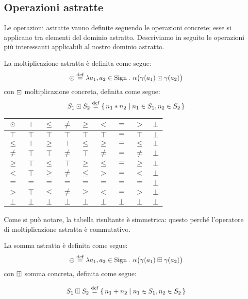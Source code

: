 \subsection{Operazioni astratte}
Le operazioni astratte vanno definite seguendo le operazioni concrete;
esse si applicano tra elementi del dominio astratto.
Descriviamo in seguito le operazioni più interessanti applicabili
al nostro dominio astratto.

\begin{definizione}
La moltiplicazione astratta è definita come segue:
\[
	\absmul \defeq \lambda a_1,a_2 \in \Sign \st \alpha\bigl(\gamma(a_1) \conmul \gamma(a_2)\bigr)
\]
con $\mathbin{\boxdot}$ moltiplicazione concreta, definita come segue:
\[
	S_1 \conmul S_2 \defeq \{\, n_1 * n_2 \mid n_1 \in S_1, n_2 \in S_2 \,\}
\]
\end{definizione}

\begin{center}
	\begin{tabular}{ c | c c c c c c c c }
		$\mathbin{\odot}$ & $\top$ & $\leq$ & $\neq$ & $\geq$ & $<$ & $=$ & $>$ & $\bot$ \\
		\hline
		$\top$ & $\top$ & $\top$ & $\top$ & $\top$ & $\top$ & $=$ & $\top$ & $\bot$  \\
		$\leq$ & $\top$ & $\geq$ & $\top$ & $\leq$ & $\geq$ & $=$ & $\leq$ & $\bot$\\
		$\neq$ & $\top$ & $\top$ & $\neq$ & $\top$ & $\neq$ & $=$ & $\neq$ & $\bot$ \\
		$\geq$ & $\top$ & $\leq$ & $\top$ & $\geq$ & $\leq$ & $=$ & $\geq$ & $\bot$ \\
		$<$ & $\top$ & $\geq$ & $\neq$ & $\leq$ & $>$ & $=$ & $<$ & $\bot$ \\
		$=$ & $=$ & $=$ & $=$ & $=$ & $=$ & $=$ & $=$ & $\bot$\\
		$>$ & $\top$ & $\leq$ & $\neq$ & $\geq$ & $<$ & $=$ & $>$ & $\bot$\\
		$\bot$ & $\bot$ & $\bot$ & $\bot$ & $\bot$ & $\bot$ & $\bot$ & $\bot$ & $\bot$ \\
	\end{tabular}
\end{center}

Come si può notare, la tabella risultante è simmetrica:
questo perché l'operatore di moltiplicazione astratta è commutativo.

\begin{definizione}
La somma astratta è definita come segue:
\[
	\absadd \defeq \lambda a_1,a_2 \in \Sign \st \alpha\bigl(\gamma(a_1) \conadd \gamma(a_2)\bigr)
\]
con $\mathbin{\boxplus}$ somma concreta, definita come segue:

\[
	S_1 \conadd S_2 \defeq \{\, n_1 + n_2 \mid n_1 \in S_1, n_2 \in S_2 \,\}
\]
\end{definizione}

